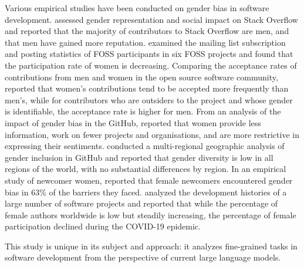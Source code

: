 \documentclass[10pt,conference]{IEEEtran}
\begin{document}
\begin{sloppy}
Various empirical studies have been conducted on gender bias in software development.
\citet{6542459} assessed gender representation and social impact on Stack Overflow and reported that the majority of contributors to Stack Overflow are men, and that men have gained more reputation.
\citet{10.1007/978-3-642-33442-9_6} examined the mailing list subscription and posting statistics of FOSS participants in six FOSS projects and found that the participation rate of women is decreasing.
Comparing the acceptance rates of contributions from men and women in the open source software community, \citet{terrell2017gender} reported that women's contributions tend to be accepted more frequently than men's, while for contributors who are outsiders to the project and whose gender is identifiable, the acceptance rate is higher for men.
From an analysis of the impact of gender bias in the GitHub, \citet{10.1109/ICSE.2019.00079} reported that women provide less information, work on fewer projects and organisations, and are more restrictive in expressing their sentiments.
\citet{9466393} conducted a multi-regional geographic analysis of gender inclusion in GitHub and reported that gender diversity is low in all regions of the world, with no substantial differences by region.
In an empirical study of newcomer women, \citet{9055190} reported that female newcomers encountered gender bias in 63\% of the barriers they faced.
\citet{10.1145/3510458.3513011} analyzed the development histories of a large number of software projects and reported that while the percentage of female authors worldwide is low but steadily increasing, the percentage of female participation declined during the COVID-19 epidemic.

This study is unique in its subject and approach: it analyzes fine-grained tasks in software development from the perspective of current large language models.


\end{sloppy}
\end{document}
